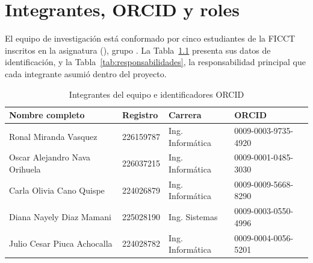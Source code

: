 \chapter{Integrantes, ORCID y roles}\label{anx:roles}
El equipo de investigación está conformado por cinco estudiantes de la FICCT inscritos en la asignatura \Materia{} (\Sigla), grupo \Grupo. La Tabla~\ref{tab:roles} presenta sus datos de identificación, y la Tabla~\ref{tab:responsabilidades}, la responsabilidad principal que cada integrante asumió dentro del proyecto.

\begin{table}[!htbp]
\caption{Integrantes del equipo e identificadores ORCID}\label{tab:roles}
\small\setlength{\tabcolsep}{4pt}
\begin{tabularx}{\textwidth}{@{}>{\raggedright}X l >{\raggedright}p{2.6cm} l@{}}
\toprule
Nombre completo & Registro & Carrera & ORCID \\
\midrule
Ronal Miranda Vasquez & 226159787 & Ing. Informática & 0009-0003-9735-4920 \\
Oscar Alejandro Nava Orihuela & 226037215 & Ing. Informática & 0009-0001-0485-3030 \\
Carla Olivia Cano Quispe & 224026879 & Ing. Informática & 0009-0009-5668-8290 \\
Diana Nayely Diaz Mamani & 225028190 & Ing. Sistemas & 0009-0003-0550-4996 \\
Julio Cesar Piuca Achocalla & 224028782 & Ing. Informática & 0009-0004-0056-5201 \\
\bottomrule
\end{tabularx}
\end{table}

